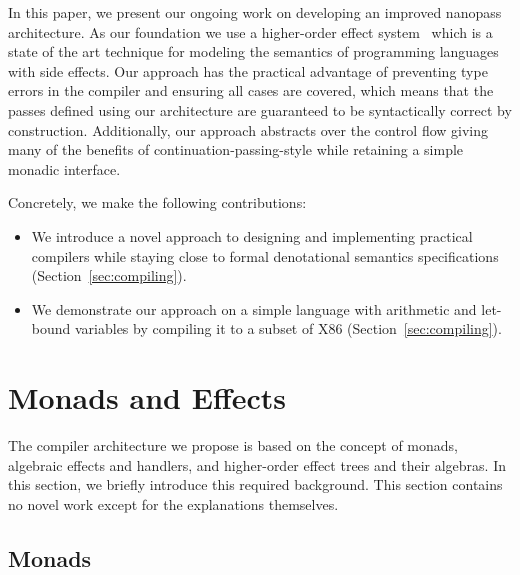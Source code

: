 \documentclass[a4paper,UKenglish,cleveref, autoref, thm-restate, anonymous]{oasics-v2021}
\begin{document}
In this paper, we present our ongoing work on developing an improved nanopass architecture.
As our foundation we use a higher-order effect system~\cite{10.1145/3571255} which is a state of the art technique for modeling the semantics of programming languages with side effects.
Our approach has the practical advantage of preventing type errors in the compiler and ensuring all cases are covered, which means that the passes defined using our architecture are guaranteed to be syntactically correct by construction.
Additionally, our approach abstracts over the control flow giving many of the benefits of continuation-passing-style while retaining a simple monadic interface.

\noindent
Concretely, we make the following contributions:
\begin{itemize}
  \item We introduce a novel approach to designing and implementing practical compilers while staying close to formal denotational semantics specifications (Section~\ref{sec:compiling}). 
  \item We demonstrate our approach on a simple language with arithmetic and let-bound variables by compiling it to a subset of X86 (Section~\ref{sec:compiling}).
\end{itemize}

\section{Monads and Effects}

The compiler architecture we propose is based on the concept of monads, algebraic effects and handlers, and higher-order effect trees and their algebras.
In this section, we briefly introduce this required background.
This section contains no novel work except for the explanations themselves.

\subsection{Monads}
\end{document}
